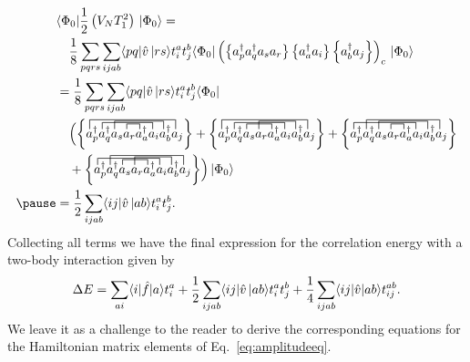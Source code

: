     \begin{align*}
        & \bra{\Phi_0} \frac{1}{2} \left( \op{V}_N \op{T}_1^2 \right) \ket{\Phi_0} = \\
            & \quad \frac{1}{8} \sum_{pqrs} \sum_{ijab} \bra{pq}\hat{v}\ket{rs} t_i^a t_j^b 
            \bra{\Phi_0} \left(\normord{a^\dagger_p a^\dagger_q a_s  a_r} 
            \normord{a^\dagger_a a_i} \normord{a^\dagger_b a_j} \right)_c\ket{\Phi_0} \\ 
        &= \frac{1}{8} \sum_{pqrs} \sum_{ijab} \bra{pq}\hat{v}\ket{rs} t_i^a t_j^b \bra{\Phi_0} \\
        & \quad \Bigl( 
        \left\{
        \contraction{a^\dagger_p a^\dagger_q a_s}{a}{{}_r}{a}
        \contraction[1.25ex]{a^\dagger_p}{a}{{}^\dagger_q a_s a_r a^\dagger_a}{a}
        \contraction[1.5ex]{a^\dagger_p a^\dagger_q }{a}{{}_s a_r a^\dagger_a a_i}{a}
        \contraction[1.75ex]{}{a}{{}^\dagger_p a^\dagger_q a_s a_r a^\dagger_a a_i a^\dagger_b}{a}
        a^\dagger_p a^\dagger_q a_s  a_r a^\dagger_a a_i a^\dagger_b a_j \right\}
        +\left\{
        \contraction{a^\dagger_p a^\dagger_q}{a}{{}_s a_r}{a}
        \contraction[1.25ex]{a^\dagger_p}{a}{{}^\dagger_q a_s a_r a^\dagger_a}{a}
        \contraction[1.5ex]{a^\dagger_p a^\dagger_q a_s}{a}{{}_r a^\dagger_a a_i}{a}
        \contraction[1.75ex]{}{a}{{}^\dagger_p a^\dagger_q a_s a_r a^\dagger_a a_i a^\dagger_b}{a}
        a^\dagger_p a^\dagger_q a_s  a_r a^\dagger_a a_i a^\dagger_b a_j \right\}
        + \left\{
        \contraction{a^\dagger_p a^\dagger_q a_s}{a}{{}_r}{a}
        \contraction[1.25ex]{}{a}{{}^\dagger_p q^\dagger_q a_s a_r a^\dagger_a}{a}
        \contraction[1.5ex]{a^\dagger_p a^\dagger_q }{a}{{}_s a_r a^\dagger_a a_i}{a}
        \contraction[1.75ex]{a^\dagger_p}{a}{{}^\dagger_q a_s a_r a^\dagger_a a_i a^\dagger_b}{a}
        a^\dagger_p a^\dagger_q a_s  a_r a^\dagger_a a_i a^\dagger_b a_j \right\} \\
        & \quad +\left\{
        \contraction{a^\dagger_p a^\dagger_q}{a}{{}_s a_r}{a}
        \contraction[1.25ex]{}{a}{{}^\dagger_p q^\dagger_q a_s a_r a^\dagger_a}{a}
        \contraction[1.5ex]{a^\dagger_p a^\dagger_q a_s}{a}{{}_r a^\dagger_a a_i}{a}
        \contraction[1.75ex]{a^\dagger_p}{a}{{}^\dagger_q a_s a_r a^\dagger_a a_i a^\dagger_b}{a}
        a^\dagger_p a^\dagger_q a_s  a_r a^\dagger_a a_i a^\dagger_b a_j \right\}
        \Bigr) \ket{\Phi_0} \\ \pause
        &= \frac{1}{2} \sum_{ijab} \bra{ij}\hat{v}\ket{ab} t_i^a t_j^b.
    \end{align*}
 Collecting all terms we have   the final expression for the correlation energy with a two-body interaction given by
  \begin{equation}\label{eq:energyccsd}
  \Delta E=\sum_{ai}\langle i| \hat{f}|a \rangle t_{i}^{a}+\frac{1}{2} \sum_{ijab} \bra{ij}\hat{v}\ket{ab} t_i^a t_j^b+
  \frac{1}{4}\sum_{ijab}\langle ij | \hat{v}| ab \rangle t_{ij}^{ab}.
  \end{equation}
We leave it as a challenge to the reader to derive the corresponding equations for the Hamiltonian matrix elements of Eq.~\ref{eq:amplitudeeq}.


